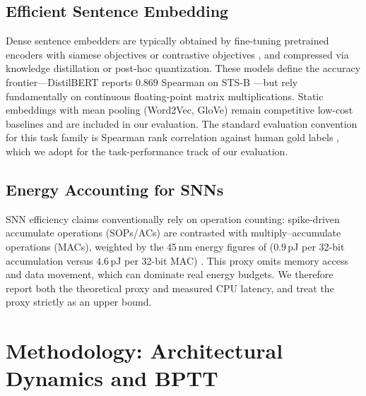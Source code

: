 \documentclass[preprint,12pt]{elsarticle}
\begin{document}
\subsection{Efficient Sentence Embedding}
Dense sentence embedders are typically obtained by fine-tuning pretrained encoders with siamese objectives \citep{reimers2019sentence} or contrastive objectives \citep{gao2021simcse}, and compressed via knowledge distillation \citep{hinton2015distilling, sanh2019distilbert, wang2020minilm} or post-hoc quantization. These models define the accuracy frontier—DistilBERT reports $0.869$ Spearman on STS-B \citep{sanh2019distilbert}—but rely fundamentally on continuous floating-point matrix multiplications. Static embeddings with mean pooling (Word2Vec, GloVe) remain competitive low-cost baselines and are included in our evaluation. The standard evaluation convention for this task family is Spearman rank correlation against human gold labels \citep{muennighoff2022mteb, cer2017semeval}, which we adopt for the task-performance track of our evaluation.

\subsection{Energy Accounting for SNNs}
SNN efficiency claims conventionally rely on operation counting: spike-driven accumulate operations (SOPs/ACs) are contrasted with multiply--accumulate operations (MACs), weighted by the 45\,nm energy figures of \citet{horowitz2014computing} ($0.9$\,pJ per 32-bit accumulation versus $4.6$\,pJ per 32-bit MAC) \citep{zhou2023spikformer, fang2023spikingjelly}. This proxy omits memory access and data movement, which can dominate real energy budgets. We therefore report both the theoretical proxy and measured CPU latency, and treat the proxy strictly as an upper bound.

\section{Methodology: Architectural Dynamics and BPTT}
\end{document}
